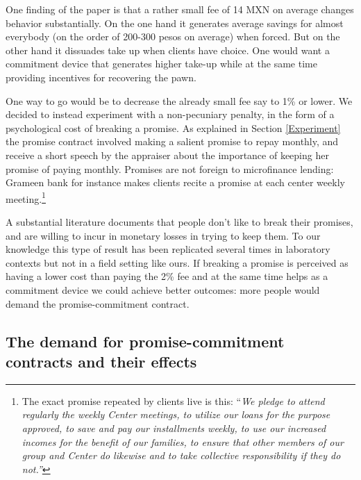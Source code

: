 \documentclass[oneside,11pt]{article}
\begin{document}
One finding of the paper is that a rather small fee of 14 MXN on average changes behavior substantially. On the one hand it generates average savings for almost everybody (on the order of 200-300 pesos on average) when forced. But on the other hand it dissuades take up when clients have choice. One would want a commitment device that generates higher take-up while at the same time providing incentives for recovering the pawn.

One way to go would be to decrease the already small fee say to 1\% or lower. We decided to instead experiment with a non-pecuniary penalty, in the form of a psychological cost of breaking a promise. As explained in Section \ref{Experiment} the promise contract involved making a salient promise to repay monthly, and receive a short speech by the appraiser about the importance of keeping her promise of paying monthly. Promises are not foreign to microfinance lending: Grameen bank for instance makes clients recite a promise at each center weekly meeting.\footnote{The exact promise repeated by clients live is this: ``\textit{We pledge to attend regularly the weekly Center meetings, to utilize our loans for the purpose approved, to save and pay our installments weekly, to use our increased incomes for the benefit of our families, to ensure that other members of our group and Center do likewise and to take collective responsibility if they do not.''}}

A substantial literature documents that people don't like to break their promises, and are willing to incur in monetary losses in trying to keep them. To our knowledge this type of result has been replicated several times in laboratory contexts but not in a field setting like ours. If breaking a promise is perceived as having a lower cost than paying the 2\% fee and at the same time helps as a commitment device we could achieve better outcomes: more people would demand the promise-commitment contract.

\subsection{The demand for promise-commitment contracts and their effects}
\end{document}
